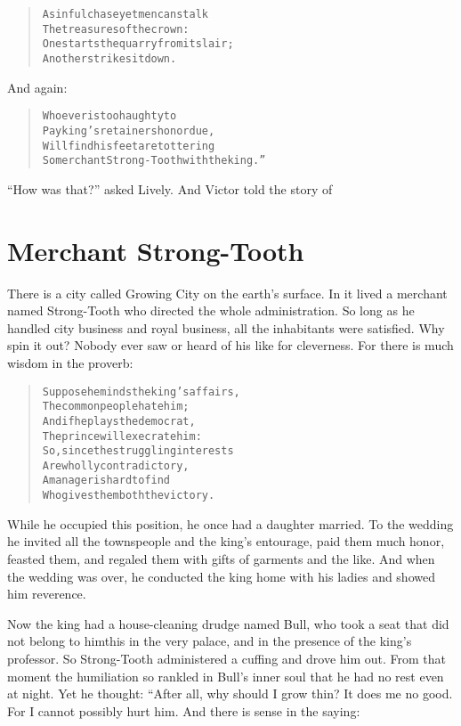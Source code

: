 \documentclass[article, twoside, 14pt]{memoir}
\renewenvironment{verbatim}{%
\begin{quote}%
\vskip -10pt%
\begin{alltt}\normalfont\large}{\end{alltt}%
\end{quote}%
\vskip -10pt
} %
\begin{document}
\begin{verbatim}
A sinful chase{\textemdash}yet men can stalk
    The treasures of the crown:
One starts the quarry from its lair;
    Another strikes it down.
\end{verbatim}
And again:

\begin{verbatim}
Whoever is too haughty to
Pay king's retainers honor due,
Will find his feet are tottering{\textemdash}
So merchant Strong-Tooth with the king.”
\end{verbatim}
``How was that?'' asked Lively. And Victor told the story of

\chapter{Merchant Strong-Tooth}

\label{s4}

There is a city called Growing City on the earth's surface.
In it lived a merchant named Strong-Tooth who directed the whole
administration. So long as he handled city business and royal
business, all the inhabitants were satisfied. Why spin it out?
Nobody ever saw or heard of his like for cleverness. For there is
much wisdom in the proverb:

\begin{verbatim}
Suppose he minds the king's affairs,
    The common people hate him;
And if he plays the democrat,
    The prince will execrate him:
So, since the struggling interests
    Are wholly contradictory,
A manager is hard to find
    Who gives them both the victory.
\end{verbatim}
While he occupied this position, he once had a daughter married. To
the wedding he invited all the townspeople and the king's
entourage, paid them much honor, feasted them, and regaled them
with gifts of garments and the like. And when the wedding was over,
he conducted the king home with his ladies and showed him
reverence.

Now the king had a house-cleaning drudge named Bull, who took a
seat that did not belong to him{\textemdash}this in the very palace, and in
the presence of the king's professor. So Strong-Tooth administered
a cuffing and drove him out. From that moment the humiliation so
rankled in Bull's inner soul that he had no rest even at night. Yet
he thought: “After all, why should I grow thin? It does me no good.
For I cannot possibly hurt him. And there is sense in the saying:
\end{document}
